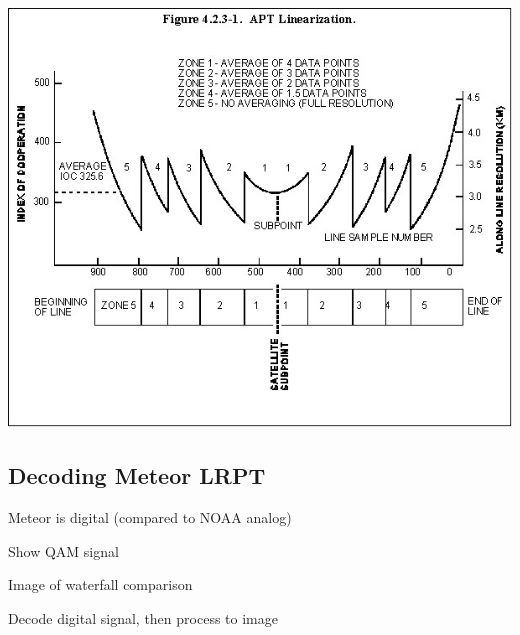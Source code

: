 \documentclass[]{beamer}
\begin{document}
\begin{frame}
    \begin{center}
    \includegraphics[width=0.75\paperwidth,height=1.0\paperheight,keepaspectratio]{images/apt-freq.jpg}
    \end{center}
\end{frame}
\subsection{Decoding Meteor LRPT}
\begin{frame}
    Meteor is digital (compared to NOAA analog)
\end{frame}
\begin{frame}
    Show QAM signal
\end{frame}
\begin{frame}
    Image of waterfall comparison
\end{frame}
\begin{frame}
    Decode digital signal, then process to image
\end{frame}
\end{document}
